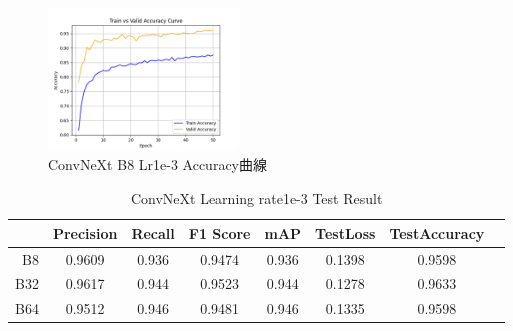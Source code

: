 \begin{figure}[htbp]
    \centering
    \includegraphics[width=0.45\textwidth]{./img/ConvNeXt/P6.png}
    \caption{ConvNeXt B8 Lr1e-3 Accuracy曲線}
    \label{fig:ConvNeXt_P6}
\end{figure}
\begin{table}
    \centering
    \caption{ConvNeXt Learning rate1e-3 Test Result}
    \begin{tabular}{|r|c|c|c|c|c|c|c|}
        \hline
        & Precision & Recall & F1 Score & mAP & TestLoss & TestAccuracy \\
        \hline
        B8 & 0.9609 & 0.936 & 0.9474 & 0.936 & 0.1398 & 0.9598 \\
        \hline
        B32 & 0.9617 & 0.944 & 0.9523 & 0.944 & 0.1278 & 0.9633 \\
        \hline
        B64 & 0.9512 & 0.946 & 0.9481 & 0.946 & 0.1335 & 0.9598 \\
        \hline
    \end{tabular}
    \label{table:ConvNeXt_T2}
\end{table}